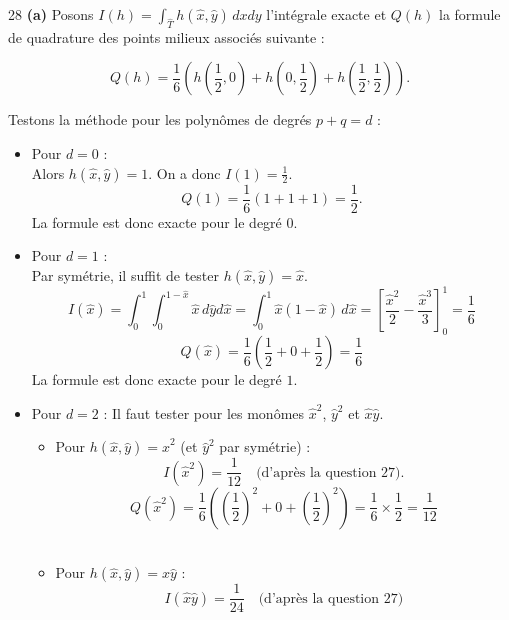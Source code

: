 \begin{reponse}{28}
    \textbf{(a)} Posons $I(h) = \int_{\hat{T}} h(\hat{x},\hat{y}) \, dxdy$ l'intégrale exacte et $Q(h)$ la formule de quadrature des points milieux associés suivante :
    
    \[
        Q(h) = \frac{1}{6} \left(h\left(\frac{1}{2},0\right)+h\left(0,\frac{1}{2}\right)+h \left(\frac{1}{2},\frac{1}{2}\right)\right).
    \]
    
    Testons la méthode pour les polynômes de degrés $p+q=d$ : 
    \\
    \begin{itemize}
        \item Pour $d=0$ : \\
        Alors $h(\hat{x}, \hat{y}) = 1$. On a donc $I(1)=\frac{1}{2}$. 
        \[
            Q(1) = \frac{1}{6} \left(1 + 1 +1 \right) = \frac{1}{2}.
        \]
        La formule est donc exacte pour le degré $0$. \\
        \item Pour $d=1$ : \\
        Par symétrie, il suffit de tester $h(\hat{x},\hat{y}) = \hat{x}$.
        \[
            I(\hat{x}) = \int_0^1 \int_0^{1-\hat{x}} \hat{x} \, d\hat{y}d\hat{x} = \int_0^1 \hat{x}(1-\hat{x}) \, d\hat{x} = \left[ \frac{\hat{x}^2}{2} - \frac{\hat{x}^3}{3} \right]_0^1 = \frac{1}{6}
        \]
        \[
            Q(\hat{x}) = \frac{1}{6} \left( \frac{1}{2} +0 + \frac{1}{2} \right) = \frac{1}{6}
        \]
        La formule est donc exacte pour le degré $1$. \\
        \item Pour $d=2$ :
        Il faut tester pour les monômes $\hat{x}^2$, $\hat{y}^2$ et $\hat{x}\hat{y}$. \\
        \begin{itemize}
            \item Pour $h(\hat{x}, \hat{y}) = \hat{x}^2$ (et $\hat{y}^2$ par symétrie) :
            \[
                I(\hat{x}^2) = \frac{1}{12} \quad \text{(d'après la question 27)}.
            \]
            \[
                Q(\hat{x}^2) = \frac{1}{6}\left(\left(\frac{1}{2}\right)^2 + 0 + \left( \frac{1}{2}\right)^2 \right)= \frac{1}{6} \times \frac{1}{2} = \frac{1}{12}
            \] \\
            \item Pour $h(\hat{x}, \hat{y}) = \hat{x}\hat{y}$ :
            \[
                I(\hat{x}\hat{y}) = \frac{1}{24} \quad \text{(d'après la question 27)}
            \]
            \[
\]
\end{itemize}
\end{itemize}
\end{reponse}

